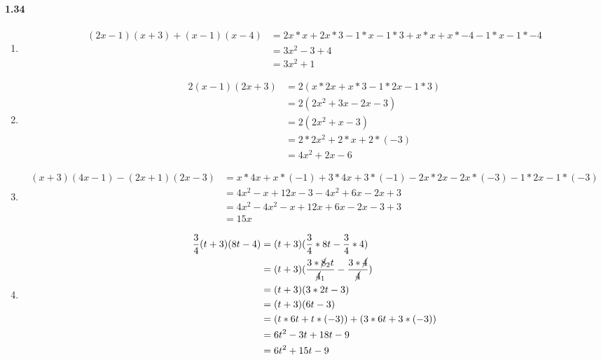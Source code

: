 \documentclass{article}
\newcommand\litem[1]{\item{\bfseries#1\space}}
\begin{document}
\paragraph{1.34}
\begin{enumerate}[label=\emph{\alph*})]
\litem{
\begin{align*}
  (2x - 1)(x + 3) + (x - 1)(x - 4) &= 2x * x + 2x * 3 - 1 * x - 1 * 3 + x * x + x * -4 - 1 * x - 1 * -4 \\ 
  &= 3x^2 - 3 + 4 \\
  &= 3x^2 + 1
\end{align*}
}
\litem{
\begin{align*}
  2(x - 1)(2x + 3) &= 2(x * 2x + x * 3 - 1 * 2x - 1 * 3) \\
  &= 2(2x^2 + 3x - 2x - 3) \\
  &= 2(2x^2 + x - 3) \\
  &= 2 * 2x^2 + 2 * x + 2 * (-3) \\
  &= 4x^2 + 2x - 6
\end{align*}
}
\litem{
\begin{align*}
  (x + 3)(4x - 1) - (2x + 1)(2x - 3) &= x * 4x + x * (-1) + 3 * 4x + 3 * (-1) - 2x * 2x - 2x * (-3) - 1 * 2x - 1 * (- 3) \\
  &= 4x^2 - x + 12x - 3 - 4x^2 + 6x - 2x + 3 \\
  &= 4x^2 - 4x^2 - x + 12x + 6x -2x - 3 + 3 \\
  &= 15x
\end{align*}
}
\litem{
\begin{align*}
  \frac{3}{4}(t + 3)(8t - 4) &= (t + 3)(\frac{3}{4} * 8t - \frac{3}{4} * 4) \\
  &= (t + 3)(\frac{3 * \cancel{8}_2t}{\cancel{4}_1} - \frac{3 * \cancel{4}}{\cancel{4}}) \\ 
  &= (t + 3)(3 * 2t - 3) \\
  &= (t + 3)(6t - 3) \\
  &= (t * 6t + t * (-3)) + (3 * 6t + 3 * (-3)) \\
  &= 6t^2 - 3t + 18t - 9 \\
  &= 6t^2 + 15t - 9
\end{align*}
}
\end{enumerate}
\end{document}
